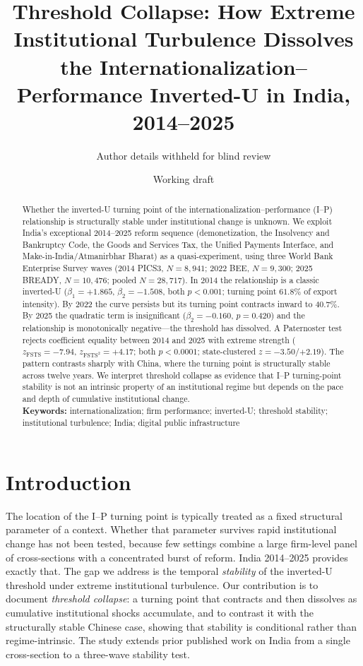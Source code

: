 \documentclass[12pt,a4paper]{article}
\title{Threshold Collapse: How Extreme Institutional Turbulence Dissolves the
Internationalization--Performance Inverted-U in India, 2014--2025}
\author{Author details withheld for blind review}
\date{Working draft}
\begin{document}
\maketitle

\begin{abstract}
\noindent Whether the inverted-U turning point of the
internationalization--performance (I--P) relationship is structurally stable
under institutional change is unknown. We exploit India's exceptional
2014--2025 reform sequence (demonetization, the Insolvency and Bankruptcy
Code, the Goods and Services Tax, the Unified Payments Interface, and
Make-in-India/Atmanirbhar Bharat) as a quasi-experiment, using three World
Bank Enterprise Survey waves (2014 PICS3, $N=8{,}941$; 2022 BEE, $N=9{,}300$;
2025 BREADY, $N=10{,}476$; pooled $N=28{,}717$). In 2014 the relationship is a
classic inverted-U ($\beta_1=+1.865$, $\beta_2=-1.508$, both $p<0.001$;
turning point $61.8\%$ of export intensity). By 2022 the curve persists but
its turning point contracts inward to $40.7\%$. By 2025 the quadratic term is
insignificant ($\beta_2=-0.160$, $p=0.420$) and the relationship is
monotonically negative---the threshold has dissolved. A Paternoster test
rejects coefficient equality between 2014 and 2025 with extreme strength
($z_{\mathrm{FSTS}}=-7.94$, $z_{\mathrm{FSTS}^2}=+4.17$; both $p<0.0001$;
state-clustered $z=-3.50$/$+2.19$). The pattern contrasts sharply with China,
where the turning point is structurally stable across twelve years. We
interpret threshold collapse as evidence that I--P turning-point stability is
not an intrinsic property of an institutional regime but depends on the pace
and depth of cumulative institutional change.\\[4pt]
\textbf{Keywords:} internationalization; firm performance; inverted-U;
threshold stability; institutional turbulence; India; digital public
infrastructure
\end{abstract}

\section{Introduction}
The location of the I--P turning point is typically treated as a fixed
structural parameter of a context. Whether that parameter survives rapid
institutional change has not been tested, because few settings combine a
large firm-level panel of cross-sections with a concentrated burst of reform.
India 2014--2025 provides exactly that. The gap we address is the temporal
\emph{stability} of the inverted-U threshold under extreme institutional
turbulence. Our contribution is to document \emph{threshold collapse}: a
turning point that contracts and then dissolves as cumulative institutional
shocks accumulate, and to contrast it with the structurally stable Chinese
case, showing that stability is conditional rather than regime-intrinsic. The
study extends prior published work on India \citep{dophan2025} from a single
cross-section to a three-wave stability test.
\end{document}
